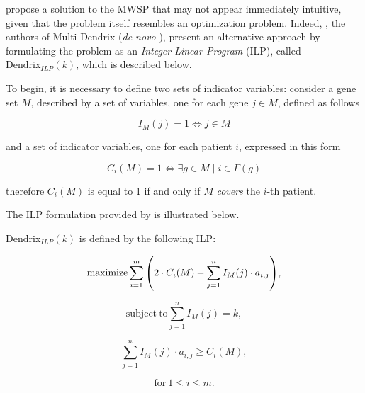 \textcite{dendrix} propose a solution to the MWSP that may not appear immediately intuitive, given that the problem itself resembles an \href{https://en.wikipedia.org/wiki/Optimization_problem}{optimization problem}. Indeed, \textcite{multi-dendrix}, the authors of Multi-Dendrix (\textit{de novo} \cite{survey}), present an alternative approach by formulating the problem as an \textit{Integer Linear Program} (ILP), called $\mathrm{Dendrix}_{\mathrm{\textit{ILP}}}(k)$, which is described below. 

To begin, it is necessary to define two sets of indicator variables: consider a gene set $M$, described by a set of variables, one for each gene $j \in M$, defined as follows

\begin{equation}
    I_M(j) = 1 \iff j \in M
\end{equation}

and a set of indicator variables, one for each patient $i$, expressed in this form

\begin{equation} \label{c_idefn}
    C_i(M) = 1 \iff \exists g \in M \mid i \in \Gamma(g)
\end{equation}

therefore $C_i(M)$ is equal to 1 if and only if $M$ \textit{covers} the $i$-th patient.

The ILP formulation provided by \textcite{multi-dendrix} is illustrated below.

\begin{definition}
    $\mathrm{Dendrix}_{\mathrm{\textit{ILP}}}(k)$ is defined by the following ILP:

    \begin{equation} \label{weight_dendrix_ilp}
        \mathrm{maximize} \sum_{i = 1}^m {\left(2 \cdot C_i(M) - \sum_{j = 1}^n I_M(j) \cdot a_{i, j}\right)},
    \end{equation}

    \begin{equation} \label{second_constr_dendrix_ilp}
        \mathrm{subject \ to} \sum_{j = 1}^n{I_M(j) = k},
    \end{equation}

    \begin{equation} \label{third_constr_dendrix_ilp}
        \sum_{j = 1}^n I_M(j) \cdot {a_{i, j}} \ge C_i(M),
    \end{equation}

    \begin{equation*}
        \mathrm{for\ } 1 \le i \le m.
    \end{equation*}
\end{definition}

